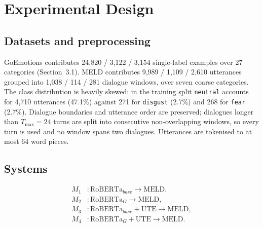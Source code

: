 \documentclass[sigconf,nonacm]{acmart}
\begin{document}
\section{Experimental Design}

\subsection{Datasets and preprocessing}
GoEmotions contributes 24{,}820 / 3{,}122 / 3{,}154 single-label examples over 27
categories (Section~3.1). MELD contributes 9{,}989 / 1{,}109 / 2{,}610 utterances grouped
into 1{,}038 / 114 / 281 dialogue windows, over seven coarse categories. The class
distribution is heavily skewed: in the training split \texttt{neutral} accounts for 4{,}710
utterances (47.1\%) against 271 for \texttt{disgust} (2.7\%) and 268 for \texttt{fear}
(2.7\%). Dialogue boundaries and utterance order are preserved; dialogues longer than
$T_{\max} = 24$ turns are split into consecutive non-overlapping windows, so every turn is
used and no window spans two dialogues. Utterances are tokenised to at most 64 word pieces.

\subsection{Systems}
\begin{align*}
M_1 &: \mathrm{RoBERTa}_{base} \rightarrow \mathrm{MELD},\\
M_2 &: \mathrm{RoBERTa}_G \rightarrow \mathrm{MELD},\\
M_3 &: \mathrm{RoBERTa}_{base} + \mathrm{UTE} \rightarrow \mathrm{MELD},\\
M_4 &: \mathrm{RoBERTa}_G + \mathrm{UTE} \rightarrow \mathrm{MELD}.
\end{align*}
\end{document}
